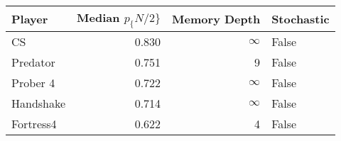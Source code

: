 \begin{tabular}{lrrl}
\toprule
    Player &  Median $p_\{N/2\}$ &  Memory Depth & Stochastic \\
\midrule
        CS &             0.830 &            \(\infty\) &      False \\
  Predator &             0.751 &             9 &      False \\
  Prober 4 &             0.722 &            \(\infty\) &      False \\
 Handshake &             0.714 &            \(\infty\) &      False \\
 Fortress4 &             0.622 &             4 &      False \\
\bottomrule
\end{tabular}
